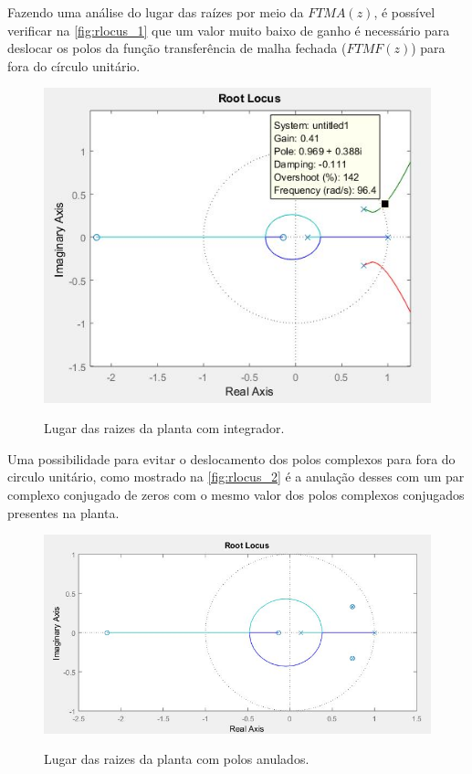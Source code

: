 \documentclass[
	article,			%
	11pt,				%
	oneside,			%
	a4paper,			%
	english,			%
	brazil,				%
	sumario=tradicional
	]{abntex2}
\begin{document}
\pagebreak

Fazendo uma análise do lugar das raízes por meio da $FTMA(z)$, é possível verificar na \autoref{fig:rlocus_1} que um valor muito baixo de ganho é necessário para deslocar os polos da função transferência de malha fechada ($FTMF(z)$) para fora do círculo unitário.

\begin{figure}[htb!]
	\centering
	\caption{Lugar das raizes da planta com integrador.}
	\includegraphics[scale=0.85]{./img/rlocus_1.JPG}
	\label{fig:rlocus_1}
\end{figure}

Uma possibilidade para evitar o deslocamento dos polos complexos para fora do circulo unitário, como mostrado na \autoref{fig:rlocus_2} é a anulação desses com um par complexo conjugado de zeros com o mesmo valor dos polos complexos conjugados presentes na planta.

\begin{figure}[htb!]
	\centering
	\caption{Lugar das raizes da planta com polos anulados.}
	\includegraphics[scale=0.7]{./img/rlocus_2.JPG}
	\label{fig:rlocus_2}
\end{figure}
\end{document}
